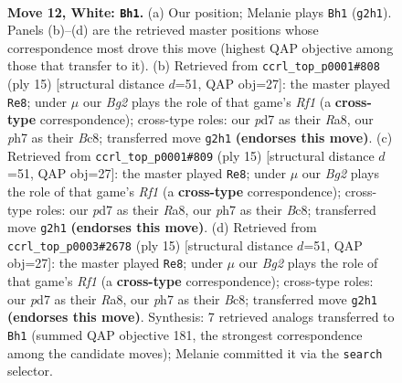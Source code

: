\documentclass[11pt]{article}
\begin{document}
\clearpage

\begin{figure}[p]\centering
\begin{subfigure}{0.46\textwidth}\centering
\resizebox{\linewidth}{!}{%
\newchessgame
\chessboard[
  setfen={r1bq1rk1/pp1p2bp/2n3p1/2p1pp1n/2P4P/4PNP1/PP1P1PB1/RNBQRK2 w - - 0 12},
  showmover=false,
  pgfstyle=straightmove, color=movearrow, markmove={g2-h1}
]}
\caption{}
\end{subfigure}\hfill
\begin{subfigure}{0.46\textwidth}\centering
\resizebox{\linewidth}{!}{%
\newchessgame
\chessboard[
  setfen={r1bq1rk1/ppp2pbp/2nppnp1/8/2PP4/P1N2NP1/1P2PPBP/R1BQ1RK1 b - - 4 8},
  showmover=false,
  pgfstyle=straightmove, color=movearrow, markmove={f8-e8}
]}
\caption{}
\end{subfigure}
\\[4pt]
\begin{subfigure}{0.46\textwidth}\centering
\resizebox{\linewidth}{!}{%
\newchessgame
\chessboard[
  setfen={r1bq1rk1/ppp2pbp/2nppnp1/8/2PP4/P1N2NP1/1P2PPBP/R1BQ1RK1 b - - 4 8},
  showmover=false,
  pgfstyle=straightmove, color=movearrow, markmove={f8-e8}
]}
\caption{}
\end{subfigure}\hfill
\begin{subfigure}{0.46\textwidth}\centering
\resizebox{\linewidth}{!}{%
\newchessgame
\chessboard[
  setfen={r1bq1rk1/ppp2pbp/2nppnp1/8/2PP4/P1N2NP1/1P2PPBP/R1BQ1RK1 b - - 4 8},
  showmover=false,
  pgfstyle=straightmove, color=movearrow, markmove={f8-e8}
]}
\caption{}
\end{subfigure}
\caption{\textbf{Move 12, White: \texttt{Bh1}.} (a) Our position; Melanie plays \texttt{Bh1} (\texttt{g2h1}). Panels (b)--(d) are the retrieved master positions whose correspondence most drove this move (highest QAP objective among those that transfer to it). (b) Retrieved from \texttt{ccrl\_top\_p0001\#808} (ply 15) [structural distance $d$=51, QAP obj=27]: the master played \texttt{Re8}; under $\mu$ our \emph{Bg2} plays the role of that game's \emph{Rf1} (a \textbf{cross-type} correspondence); cross-type roles: our \emph{p}d7 as their \emph{R}a8, our \emph{p}h7 as their \emph{B}c8; transferred move \texttt{g2h1} \textbf{(endorses this move)}. (c) Retrieved from \texttt{ccrl\_top\_p0001\#809} (ply 15) [structural distance $d$=51, QAP obj=27]: the master played \texttt{Re8}; under $\mu$ our \emph{Bg2} plays the role of that game's \emph{Rf1} (a \textbf{cross-type} correspondence); cross-type roles: our \emph{p}d7 as their \emph{R}a8, our \emph{p}h7 as their \emph{B}c8; transferred move \texttt{g2h1} \textbf{(endorses this move)}. (d) Retrieved from \texttt{ccrl\_top\_p0003\#2678} (ply 15) [structural distance $d$=51, QAP obj=27]: the master played \texttt{Re8}; under $\mu$ our \emph{Bg2} plays the role of that game's \emph{Rf1} (a \textbf{cross-type} correspondence); cross-type roles: our \emph{p}d7 as their \emph{R}a8, our \emph{p}h7 as their \emph{B}c8; transferred move \texttt{g2h1} \textbf{(endorses this move)}. Synthesis: 7 retrieved analogs transferred to \texttt{Bh1} (summed QAP objective 181, the strongest correspondence among the candidate moves); Melanie committed it via the \texttt{search} selector.}

\end{figure}
\end{document}
